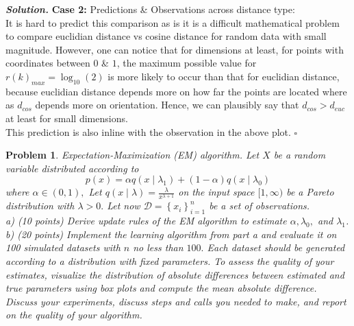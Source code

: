 \documentclass[12pt]{article}
\newtheorem{problem}{Problem}
\newenvironment{solution}[1][\it{Solution}]{\textbf{#1. } }{$\square$}
\begin{document}
\begin{solution}
\textbf{Case 2:} Predictions \& Observations across distance type:\\
It is hard to predict this comparison as is it is a difficult mathematical problem to compare euclidian distance vs cosine distance for random data with small magnitude. However, one can notice that for dimensions at least, for points with coordinates between $0$ \& $1$,  the maximum possible value for $r(k)_{max} = \log_{10}\left(2\right)$ is more likely to occur than that for euclidian distance,  because euclidian distance depends more on how far the points are located where as $d_{cos}$ depends more on orientation. Hence, we can plausibly say that $d_{cos} > d_{euc}$ at least for small dimensions.\\

This prediction is also inline with the observation in the above plot.
\end{solution}

\begin{problem}
Expectation-Maximization (EM) algorithm. Let $X$ be a random variable distributed according to
$$
p(x)=\alpha q\left(x \mid \lambda_{1}\right)+(1-\alpha) q\left(x \mid \lambda_{0}\right)
$$
where $\alpha \in(0,1),$ Let $q(x \mid \lambda)=\frac{\lambda}{x^{\lambda+1}}$ on the input space $[1, \infty)$ be a Pareto distribution with $\lambda>0 .$ Let now $\mathcal{D}=\left\{x_{i}\right\}_{i=1}^{n}$ be a set of observations.\\
a) (10 points) Derive update rules of the EM algorithm to estimate $\alpha, \lambda_{0},$ and $\lambda_{1}$.\\
b) (20 points) Implement the learning algorithm from part a and evaluate it on 100 simulated datasets with $n$ no less than $100 .$ Each dataset should be generated according to a distribution with fixed parameters. To assess the quality of your estimates, visualize the distribution of absolute differences between estimated and true parameters using box plots and compute the mean absolute difference. Discuss your experiments, discuss steps and calls you needed to make, and report on the quality of your algorithm.
\end{problem}
\end{document}

